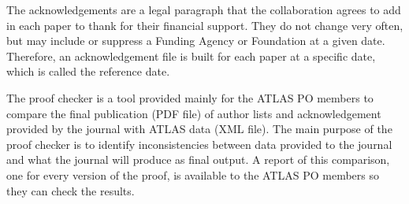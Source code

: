 The acknowledgements are a legal paragraph that the collaboration agrees to add in each paper to thank  for their financial support.
They do not change very often, but may include or suppress a Funding Agency or Foundation at a given date.
Therefore, an acknowledgement file is built for each paper at a specific date, which is called the reference date.

The proof checker is a tool provided mainly for the ATLAS PO members to compare the final publication (PDF file) of author lists and acknowledgement provided by the journal with ATLAS data (XML file). The main purpose of the proof checker is to identify inconsistencies between data provided to the journal and what the journal will produce as final output. A report of this comparison, one for every version of the proof, is available to the ATLAS PO members so they can check the results.

